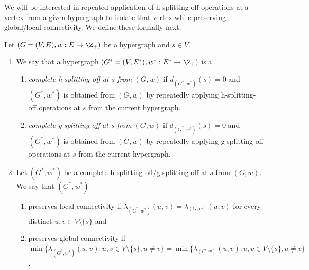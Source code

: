 We will be interested in repeated application of h-splitting-off operations at a vertex from a given hypergraph to isolate that vertex while preserving global/local connectivity. We define these formally next. 
\begin{definition}
    Let $(G=(V, E), w: E\rightarrow \Z_+)$ be a hypergraph and $s\in V$. 
    \begin{enumerate}
        \item We say that a hypergraph $(G^*=(V, E^*), w^*: E^*\rightarrow \Z_+)$ is a 
        \begin{enumerate}
            \item \emph{complete h-splitting-off at $s$ from $(G, w)$} if $d_{(G^*, w^*)}(s) = 0$ and $(G^*, w^*)$ is obtained from $(G, w)$ by repeatedly applying h-splitting-off operations at $s$ from the current hypergraph. 
            \item \emph{complete g-splitting-off at $s$ from $(G, w)$} if $d_{(G^*, w^*)}(s) = 0$ and $(G^*, w^*)$ is obtained from $(G, w)$ by repeatedly applying g-splitting-off operations at $s$ from the current hypergraph. 
        \end{enumerate}

        \item Let $(G^*, w^*)$ be a complete h-splitting-off/g-splitting-off at $s$ from $(G, w)$. We say that $(G^*, w^*)$ 
        \begin{enumerate}
            \item 
            preserves local connectivity if $\lambda_{(G^*, w^*)}(u, v)=\lambda_{(G, w)}(u, v)$ for every distinct $u, v\in V\setminus\{s\}$ and 
            
            \item preserves global connectivity if \\
            $\min\{\lambda_{(G^*, w^*)}(u, v): u, v\in V\setminus \{s\}, u \neq v\}=\min\{\lambda_{(G, w)}(u, v): u, v\in V\setminus \{s\}, u \neq v\}$. 
            
        \end{enumerate}
    \end{enumerate}
\end{definition}

